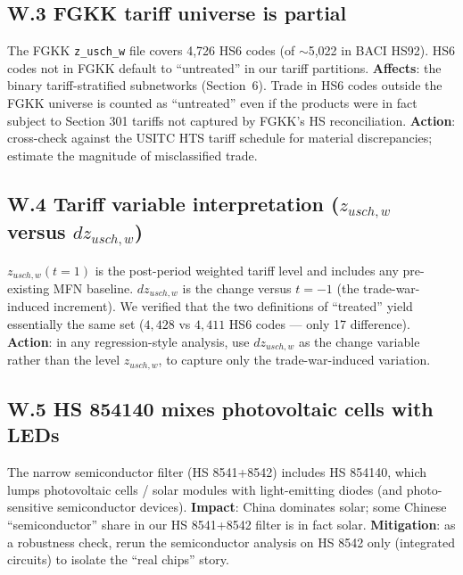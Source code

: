 \documentclass[11pt,a4paper]{article}
\begin{document}
\subsection*{W.3 FGKK tariff universe is partial}

\begin{warnbox}
The FGKK \texttt{z\_usch\_w} file covers 4{,}726 HS6 codes
(of $\sim$5{,}022 in BACI HS92). HS6 codes not in FGKK default to
``untreated'' in our tariff partitions.
\textbf{Affects}: the binary tariff-stratified subnetworks
(Section~6). Trade in HS6 codes outside the FGKK universe is counted as
``untreated'' even if the products were in fact subject to Section 301
tariffs not captured by FGKK's HS reconciliation.
\textbf{Action}: cross-check against the USITC HTS tariff schedule for
material discrepancies; estimate the magnitude of misclassified trade.
\end{warnbox}

\subsection*{W.4 Tariff variable interpretation
($z_{usch,w}$ versus $dz_{usch,w}$)}

\begin{warnbox}
$z_{usch,w}(t=1)$ is the post-period weighted tariff level and includes
any pre-existing MFN baseline. $dz_{usch,w}$ is the change versus
$t=-1$ (the trade-war-induced increment). We verified that the
two definitions of ``treated'' yield essentially the same set
($4{,}428$ vs $4{,}411$ HS6 codes — only 17 difference).
\textbf{Action}: in any regression-style analysis, use
$dz_{usch,w}$ as the change variable rather than the level
$z_{usch,w}$, to capture only the trade-war-induced variation.
\end{warnbox}

\subsection*{W.5 HS 854140 mixes photovoltaic cells with LEDs}

\begin{warnbox}
The narrow semiconductor filter (HS 8541+8542) includes HS 854140,
which lumps photovoltaic cells / solar modules with light-emitting
diodes (and photo-sensitive semiconductor devices).
\textbf{Impact}: China dominates solar; some Chinese ``semiconductor''
share in our HS 8541+8542 filter is in fact solar.
\textbf{Mitigation}: as a robustness check, rerun the semiconductor
analysis on HS 8542 only (integrated circuits) to isolate the
``real chips'' story.
\end{warnbox}
\end{document}
